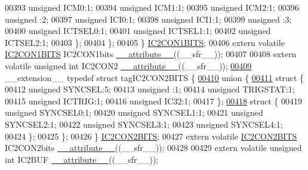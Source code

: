\begin{DoxyCode}
00393       \textcolor{keywordtype}{unsigned} ICM0:1;
00394       \textcolor{keywordtype}{unsigned} ICM1:1;
00395       \textcolor{keywordtype}{unsigned} ICM2:1;
00396       \textcolor{keywordtype}{unsigned} :2;
00397       \textcolor{keywordtype}{unsigned} ICI0:1;
00398       \textcolor{keywordtype}{unsigned} ICI1:1;
00399       \textcolor{keywordtype}{unsigned} :3;
00400       \textcolor{keywordtype}{unsigned} ICTSEL0:1;
00401       \textcolor{keywordtype}{unsigned} ICTSEL1:1;
00402       \textcolor{keywordtype}{unsigned} ICTSEL2:1;
00403     \};
00404   \};
00405 \} \hyperlink{a00008_d5/d5f/a00461}{IC2CON1BITS};
00406 \textcolor{keyword}{extern} \textcolor{keyword}{volatile} \hyperlink{a00008_d5/d5f/a00461}{IC2CON1BITS} IC2CON1bits \hyperlink{a00009_a493c46f03454991ccc5aa7a6e1dfb2a7}{\_\_attribute\_\_}((\_\_sfr\_\_));
00407 
00408 \textcolor{keyword}{extern} \textcolor{keyword}{volatile} \textcolor{keywordtype}{unsigned} \textcolor{keywordtype}{int}  IC2CON2 \hyperlink{a00009_a493c46f03454991ccc5aa7a6e1dfb2a7}{\_\_attribute\_\_}((\_\_sfr\_\_));
\hypertarget{a00009_source_l00409}{}\hyperlink{a00008}{00409} \_\_extension\_\_ \textcolor{keyword}{typedef} \textcolor{keyword}{struct }tagIC2CON2BITS \{
\hypertarget{a00009_source_l00410}{}\hyperlink{a00009}{00410}   \textcolor{keyword}{union }\{
\hypertarget{a00009_source_l00411}{}\hyperlink{a00009}{00411}     \textcolor{keyword}{struct }\{
00412       \textcolor{keywordtype}{unsigned} SYNCSEL:5;
00413       \textcolor{keywordtype}{unsigned} :1;
00414       \textcolor{keywordtype}{unsigned} TRIGSTAT:1;
00415       \textcolor{keywordtype}{unsigned} ICTRIG:1;
00416       \textcolor{keywordtype}{unsigned} IC32:1;
00417     \};
\hypertarget{a00009_source_l00418}{}\hyperlink{a00009}{00418}     \textcolor{keyword}{struct }\{
00419       \textcolor{keywordtype}{unsigned} SYNCSEL0:1;
00420       \textcolor{keywordtype}{unsigned} SYNCSEL1:1;
00421       \textcolor{keywordtype}{unsigned} SYNCSEL2:1;
00422       \textcolor{keywordtype}{unsigned} SYNCSEL3:1;
00423       \textcolor{keywordtype}{unsigned} SYNCSEL4:1;
00424     \};
00425   \};
00426 \} \hyperlink{a00008_d2/d9d/a00464}{IC2CON2BITS};
00427 \textcolor{keyword}{extern} \textcolor{keyword}{volatile} \hyperlink{a00008_d2/d9d/a00464}{IC2CON2BITS} IC2CON2bits \hyperlink{a00009_a493c46f03454991ccc5aa7a6e1dfb2a7}{\_\_attribute\_\_}((\_\_sfr\_\_));
00428 
00429 \textcolor{keyword}{extern} \textcolor{keyword}{volatile} \textcolor{keywordtype}{unsigned} \textcolor{keywordtype}{int}  IC2BUF \hyperlink{a00009_a493c46f03454991ccc5aa7a6e1dfb2a7}{\_\_attribute\_\_}((\_\_sfr\_\_));

\end{DoxyCode}
